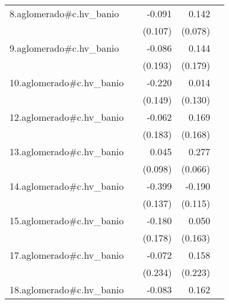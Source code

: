 {\begin{longtable}{l*{4}{D{.}{.}{-1}}}
\addlinespace
8.aglomerado#c.hv\_banio&                     &      -0.091         &       0.142         &                     \\
            &                     &     (0.107)         &     (0.078)         &                     \\
\addlinespace
9.aglomerado#c.hv\_banio&                     &      -0.086         &       0.144         &                     \\
            &                     &     (0.193)         &     (0.179)         &                     \\
\addlinespace
10.aglomerado#c.hv\_banio&                     &      -0.220         &       0.014         &                     \\
            &                     &     (0.149)         &     (0.130)         &                     \\
\addlinespace
12.aglomerado#c.hv\_banio&                     &      -0.062         &       0.169         &                     \\
            &                     &     (0.183)         &     (0.168)         &                     \\
\addlinespace
13.aglomerado#c.hv\_banio&                     &       0.045         &       0.277\sym{***}&                     \\
            &                     &     (0.098)         &     (0.066)         &                     \\
\addlinespace
14.aglomerado#c.hv\_banio&                     &      -0.399\sym{**} &      -0.190         &                     \\
            &                     &     (0.137)         &     (0.115)         &                     \\
\addlinespace
15.aglomerado#c.hv\_banio&                     &      -0.180         &       0.050         &                     \\
            &                     &     (0.178)         &     (0.163)         &                     \\
\addlinespace
17.aglomerado#c.hv\_banio&                     &      -0.072         &       0.158         &                     \\
            &                     &     (0.234)         &     (0.223)         &                     \\
\addlinespace
18.aglomerado#c.hv\_banio&                     &      -0.083         &       0.162\sym{**} &                     \\

\end{longtable}}
